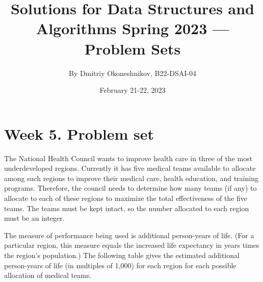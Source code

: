\documentclass{article}
\title{Solutions for Data Structures and Algorithms Spring 2023 — Problem Sets}
\author{By Dmitriy Okoneshnikov, B22-DSAI-04}
\date{February 21-22, 2023}
\begin{document}
\maketitle

\section*{Week 5. Problem set}

The National Health Council wants to improve health care in three of the most underdeveloped regions. Currently it has five medical teams available to allocate among such regions to improve their medical care, health education, and training programs. Therefore, the council needs to determine how many teams (if any) to allocate to each of these regions to maximize the total effectiveness of the five teams. The teams must be kept intact, so the number allocated to each region must be an integer.

The measure of performance being used is additional person-years of life. (For a particular region, this measure equals the increased life expectancy in years times the region’s population.) The following table gives the estimated additional person-years of life (in multiples of 1,000) for each region for each possible allocation of medical teams.
\end{document}
